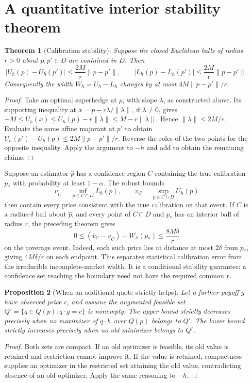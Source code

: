 \documentclass[11pt,a4paper]{article}
\newtheorem{theorem}{Theorem}[section]
\newtheorem{proposition}[theorem]{Proposition}
\theoremstyle{remark}
\begin{document}
\section{A quantitative interior stability theorem}
\begin{theorem}[Calibration stability]
Suppose the closed Euclidean balls of radius $r>0$ about $p,p'\in D$ are contained in $D$. Then
\[
 |U_h(p)-U_h(p')|\le\frac{2M}{r}\|p-p'\|,
 \qquad
 |L_h(p)-L_h(p')|\le\frac{2M}{r}\|p-p'\|.
\]
Consequently the width $W_h=U_h-L_h$ changes by at most $4M\|p-p'\|/r$.
\end{theorem}
\begin{proof}
Take an optimal superhedge at $p$, with slope $\lambda$, as constructed above. Its supporting inequality at $x=p-r\lambda/\|\lambda\|$, if $\lambda\ne0$, gives
$-M\le U_h(x)\le U_h(p)-r\|\lambda\|\le M-r\|\lambda\|$.
Hence $\|\lambda\|\le2M/r$. Evaluate the same affine majorant at $p'$ to obtain
$U_h(p')-U_h(p)\le2M\|p-p'\|/r$. Reverse the roles of the two points for the opposite inequality. Apply the argument to $-h$ and add to obtain the remaining claims.
\end{proof}

Suppose an estimator $\widehat p$ has a confidence region $C$ containing the true calibration $p_*$ with probability at least $1-\alpha$. The robust bounds
\[
 \underline v_C=\inf_{p\in C\cap D}L_h(p),\qquad
 \overline v_C=\sup_{p\in C\cap D}U_h(p)
\]
then contain every price consistent with the true calibration on that event. If $C$ is a radius-$\delta$ ball about $\widehat p$, and every point of $C\cap D$ and $p_*$ has an interior ball of radius $r$, the preceding theorem gives
\[
 0\le (\overline v_C-\underline v_C)-W_h(p_*)\le\frac{8M\delta}{r}
\]
on the coverage event. Indeed, each such price lies at distance at most $2\delta$ from $p_*$, giving $4M\delta/r$ on each endpoint. This separates statistical calibration error from the irreducible incomplete-market width. It is a conditional stability guarantee: a confidence set reaching the boundary need not have the required common $r$.

\begin{proposition}[When an additional quote strictly helps]
Let a further payoff $g$ have observed price $c$, and assume the augmented feasible set $Q' =\{q\in Q(p):q\cdot g=c\}$ is nonempty. The upper bound strictly decreases precisely when no maximizer of $q\cdot h$ over $Q(p)$ belongs to $Q'$. The lower bound strictly increases precisely when no old minimizer belongs to $Q'$.
\end{proposition}
\begin{proof}
Both sets are compact. If an old optimizer is feasible, its old value is retained and restriction cannot improve it. If the value is retained, compactness supplies an optimizer in the restricted set attaining the old value, contradicting absence of an old optimizer. Apply the same reasoning to $-h$.
\end{proof}
\end{document}
